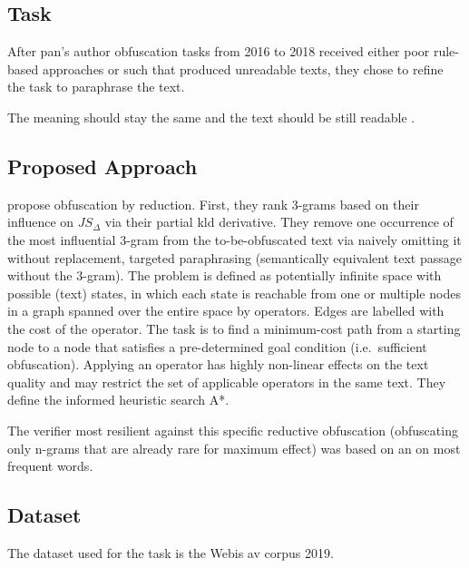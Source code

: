 \subsection{Task}
After \ac{pan}'s author obfuscation tasks from 2016 to 2018 received either poor rule-based approaches or such that 
produced unreadable texts, they chose to refine the task to paraphrase the text.

\begin{definition}
    [Paraphrase]
    The meaning should stay the same and the text should be still readable \citep{bevendorff_divergence_based_2020}.
\end{definition}

\subsection{Proposed Approach}
\citet{bevendorff_divergence_based_2020} propose obfuscation by reduction.
First, they rank 3-grams based on their influence on $JS_\Delta$ via their partial \ac{kld} derivative.
They remove one occurrence of the most influential 3-gram from the to-be-obfuscated text via naively omitting it without replacement, 
targeted paraphrasing (semantically equivalent text passage without the 3-gram).
The problem is defined as potentially infinite space with possible (text) states, 
in which each state is reachable from one or multiple nodes in a graph spanned over the entire space by operators.
Edges are labelled with the cost of the operator.
The task is to find a minimum-cost path from a starting node to a node that satisfies a pre-determined goal condition 
(i.e.\ sufficient obfuscation).
Applying an operator has highly non-linear effects on the text quality and may restrict the set of applicable operators in the same text.
They define the informed heuristic search A*.

The verifier most resilient against this specific reductive obfuscation (obfuscating only n-grams that are already rare for maximum effect) 
was based on an \impAppr{} on most frequent words.

\subsection{Dataset}
The dataset used for the task is the Webis \acl{av} corpus 2019.